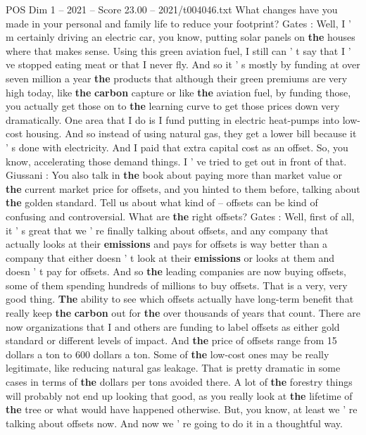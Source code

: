 \begin{textsample}{POS Dim 1 – 2021 – Score 23.00 – 2021/t004046.txt}
What changes have you made in your personal and family life to reduce your footprint?
Gates : Well, I ' m certainly driving an electric car, you know, putting solar panels on \textbf{the} houses where that makes sense.
Using this green aviation fuel, I still can ' t say that I ' ve stopped eating meat or that I never fly.
And so it ' s mostly by funding at over seven million a year \textbf{the} products that although their green premiums are very high today, like \textbf{the} \textbf{carbon} capture or like \textbf{the} aviation fuel, by funding those, you actually get those on to \textbf{the} learning curve to get those prices down very dramatically.
One area that I do is I fund putting in electric heat-pumps into low-cost housing.
And so instead of using natural gas, they get a lower bill because it ' s done with electricity.
And I paid that extra capital cost as an offset.
So, you know, accelerating those demand things.
I ' ve tried to get out in front of that.
Giussani : You also talk in \textbf{the} book about paying more than market value or \textbf{the} current market price for offsets, and you hinted to them before, talking about \textbf{the} golden standard.
Tell us about what kind of -- offsets can be kind of confusing and controversial.
What are \textbf{the} right offsets?
Gates : Well, first of all, it ' s great that we ' re finally talking about offsets, and any company that actually looks at their \textbf{emissions} and pays for offsets is way better than a company that either doesn ' t look at their \textbf{emissions} or looks at them and doesn ' t pay for offsets.
And so \textbf{the} leading companies are now buying offsets, some of them spending hundreds of millions to buy offsets.
That is a very, very good thing. \textbf{The} ability to see which offsets actually have long-term benefit that really keep \textbf{the} \textbf{carbon} out for \textbf{the} over thousands of years that count.
There are now organizations that I and others are funding to label offsets as either gold standard or different levels of impact.
And \textbf{the} price of offsets range from 15 dollars a ton to 600 dollars a ton.
Some of \textbf{the} low-cost ones may be really legitimate, like reducing natural gas leakage.
That is pretty dramatic in some cases in terms of \textbf{the} dollars per tons avoided there.
A lot of \textbf{the} forestry things will probably not end up looking that good, as you really look at \textbf{the} lifetime of \textbf{the} tree or what would have happened otherwise.
But, you know, at least we ' re talking about offsets now.
And now we ' re going to do it in a thoughtful way.

\end{textsample}
